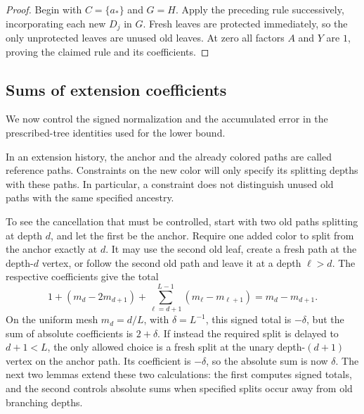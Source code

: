 \begin{proof}
Begin with $C=\{a_*\}$ and $G=H$.
Apply the preceding rule successively, incorporating each new $D_j$
in $G$.  Fresh leaves are protected immediately, so the only
unprotected leaves are unused old leaves.  At zero all factors $A$
and $Y$ are $1$, proving the claimed rule and its coefficients.
\end{proof}

\subsection{Sums of extension coefficients}

We now control the signed normalization and the accumulated error in
the prescribed-tree identities used for the lower bound.

In an extension history, the anchor and the already colored paths
are called reference paths.  Constraints on the new color will only
specify its splitting depths with these paths.  In particular, a
constraint does not distinguish unused old paths with the same
specified ancestry.

To see the cancellation that must be controlled, start with two old
paths splitting at depth $d$, and let the first be the anchor. Require
one added color to split from the anchor exactly at $d$. It may use the
second old leaf, create a fresh path at the depth-$d$ vertex, or follow
the second old path and leave it at a depth $\ell>d$. The respective
coefficients give the total
\[
  1+(m_d-2m_{d+1})
       +\sum_{\ell=d+1}^{L-1}(m_\ell-m_{\ell+1})
  =m_d-m_{d+1}.
\]
On the uniform mesh $m_d=d/L$, with $\delta=L^{-1}$, this signed total
is $-\delta$, but the sum of absolute coefficients is $2+\delta$.
If instead the required split is delayed to $d+1<L$, the only allowed
choice is a fresh split at the unary depth-$(d+1)$ vertex on the anchor
path. Its coefficient is $-\delta$, so the absolute sum is now $\delta$.
The next two lemmas extend these two calculations: the first
computes signed totals, and the second controls absolute sums when
specified splits occur away from old branching depths.

